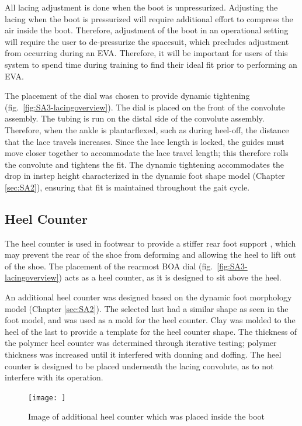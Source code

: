 \documentclass[defaultstyle,11pt]{comps}
\begin{document}
All lacing adjustment is done when the boot is unpressurized.
Adjusting the lacing when the boot is pressurized will require additional effort to compress the air inside the boot.
Therefore, adjustment of the boot in an operational setting will require the user to de-pressurize the spacesuit, which precludes adjustment from occurring during an EVA.
Therefore, it will be important for users of this system to spend time during training to find their ideal fit prior to performing an EVA.

The placement of the dial was chosen to provide dynamic tightening (fig.~\ref{fig:SA3-lacingoverview}).
The dial is placed on the front of the convolute assembly.
The tubing is run on the distal side of the convolute assembly.
Therefore, when the ankle is plantarflexed, such as during heel-off, the distance that the lace travels increases.
Since the lace length is locked, the guides must move closer together to accommodate the lace travel length; this therefore rolls the convolute and tightens the fit.
The dynamic tightening accommodates the drop in instep height characterized in the dynamic foot shape model (Chapter \ref{sec:SA2}), ensuring that fit is maintained throughout the gait cycle.

\hypertarget{heel-counter}{%
\subsection{Heel Counter}\label{heel-counter}}

The heel counter is used in footwear to provide a stiffer rear foot support \citep{Van1995}, which may prevent the rear of the shoe from deforming and allowing the heel to lift out of the shoe.
The placement of the rearmost BOA dial (fig.~\ref{fig:SA3-lacingoverview}) acts as a heel counter, as it is designed to sit above the heel.

An additional heel counter was designed based on the dynamic foot morphology model (Chapter \ref{sec:SA2}).
The selected last had a similar shape as seen in the foot model, and was used as a mold for the heel counter.
Clay was molded to the heel of the last to provide a template for the heel counter shape.
The thickness of the polymer heel counter was determined through iterative testing; polymer thickness was increased until it interfered with donning and doffing.
The heel counter is designed to be placed underneath the lacing convolute, as to not interfere with its operation.

\begin{figure}
\hypertarget{fig:SA3-heelcounter}{%
\centering
\texttt{[image: ]}
\caption{Image of additional heel counter which was placed inside the boot}\label{fig:SA3-heelcounter}
}
\end{figure}
\end{document}
